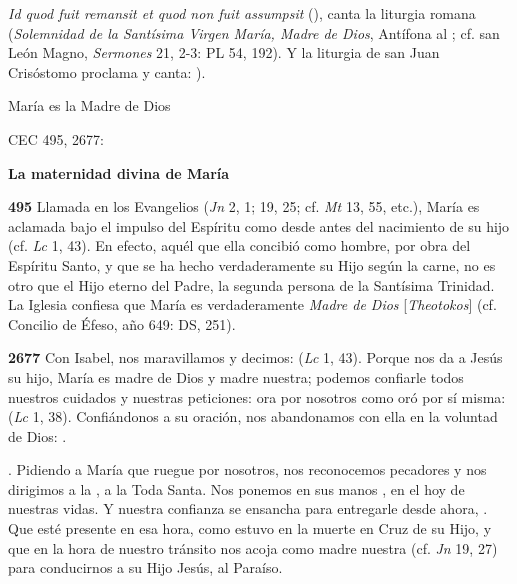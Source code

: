 \begin{body}
\begin{body}
\emph{Id quod fuit remansit et quod non fuit assumpsit} (), canta la liturgia romana (\emph{Solemnidad de la Santísima Virgen María, Madre de Dios}, Antífona al ; cf. san León Magno, \emph{Sermones} 21, 2-3: PL 54, 192). Y la liturgia de san Juan Crisóstomo proclama y canta: ).

María es la Madre de Dios

CEC 495, 2677:

\textbf{La maternidad divina de María}

\textbf{495} Llamada en los Evangelios  (\emph{Jn} 2, 1; 19, 25; cf. \emph{Mt} 13, 55, etc.), María es aclamada bajo el impulso del Espíritu como  desde antes del nacimiento de su hijo (cf. \emph{Lc} 1, 43). En efecto, aquél que ella concibió como hombre, por obra del Espíritu Santo, y que se ha hecho verdaderamente su Hijo según la carne, no es otro que el Hijo eterno del Padre, la segunda persona de la Santísima Trinidad. La Iglesia confiesa que María es verdaderamente \emph{Madre de Dios} {[}\emph{Theotokos}{]} (cf. Concilio de Éfeso, año 649: DS, 251).

\textbf{2677} \emph{} Con Isabel, nos maravillamos y decimos:  (\emph{Lc} 1, 43). Porque nos da a Jesús su hijo, María es madre de Dios y madre nuestra; podemos confiarle todos nuestros cuidados y nuestras peticiones: ora por nosotros como oró por sí misma:  (\emph{Lc} 1, 38). Confiándonos a su oración, nos abandonamos con ella en la voluntad de Dios: .

\emph{}. Pidiendo a María que ruegue por nosotros, nos reconocemos pecadores y nos dirigimos a la , a la Toda Santa. Nos ponemos en sus manos , en el hoy de nuestras vidas. Y nuestra confianza se ensancha para entregarle desde ahora, . Que esté presente en esa hora, como estuvo en la muerte en Cruz de su Hijo, y que en la hora de nuestro tránsito nos acoja como madre nuestra (cf. \emph{Jn} 19, 27) para conducirnos a su Hijo Jesús, al Paraíso.


\end{body}
\end{body}
